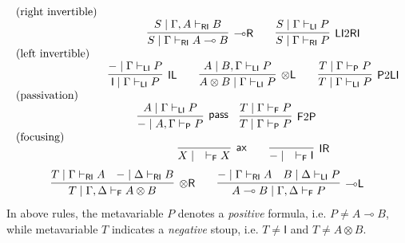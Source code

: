 \documentclass[submission,copyright,creativecommons]{eptcs}
\theoremstyle{definition}
\newcommand{\tl}{\otimes \mathsf{L}}
\newcommand{\tr}{\otimes \mathsf{R}}
\newcommand{\lright}{{\multimap}\mathsf{R}}
\newcommand{\lleft}{{\multimap}\mathsf{L}}
\newcommand{\pass}{\mathsf{pass}}
\newcommand{\unitl}{\mathsf{IL}}
\newcommand{\unitr}{\mathsf{IR}}
\newcommand{\ax}{\mathsf{ax}}
\newcommand{\ot}{\otimes}
\newcommand{\lolli}{\multimap}
\newcommand{\I}{\mathsf{I}}
\newcommand{\RI}{\mathsf{RI}}
\newcommand{\LI}{\mathsf{LI}}
\newcommand{\Pass}{\mathsf{P}}
\newcommand{\F}{\mathsf{F}}
\begin{document}
\begin{displaymath}
  \begin{array}{lc}
    \text{(right invertible)} & \\ &
    \infer[\lright]{S \mid \Gamma \vdash_{\RI} A \lolli B}{S \mid \Gamma , A \vdash_{\RI} B}
    \qquad
    \infer[\LI 2 \RI]{S \mid \Gamma \vdash_{\RI} P}{S \mid \Gamma \vdash_{\LI} P}
    \\
    \text{(left invertible)} & \\ &
    \infer[\unitl]{\I \mid \Gamma \vdash_{\LI} P}{- \mid \Gamma \vdash_{\LI} P}
    \qquad
    \infer[\tl]{A \ot B \mid \Gamma \vdash_{\LI} P}{A \mid B , \Gamma \vdash_{\LI} P}
    \qquad
    \infer[\Pass 2 \LI]{T \mid \Gamma \vdash_{\LI} P}{T \mid \Gamma \vdash_{\Pass} P}
    \\
    \text{(passivation)} & \\ &
    \hspace{-1.7cm}
    \infer[\pass]{- \mid A , \Gamma \vdash_{\Pass} P }{
      A\mid \Gamma \vdash_{\LI} P
    }
    \quad
    \infer[\F 2 \Pass]{T \mid \Gamma \vdash_{\Pass} P}{
      T \mid \Gamma \vdash_{\F} P
    }
    \\
    \text{(focusing)} &    \\ &
    \infer[\ax]{X \mid \quad \vdash_{\F} X}{}
    \qquad
    \infer[\unitr]{- \mid \quad \vdash_{\F} \I}{}
    \\[6pt]
    \multicolumn{2}{c}{
    \infer[\tr]{T \mid \Gamma , \Delta \vdash_{\F} A \ot B}{
      T \mid \Gamma \vdash_{\RI} A
      &
      - \mid \Delta \vdash_{\RI} B
    }
    \qquad
    \infer[\lleft]{A \lolli B \mid \Gamma , \Delta \vdash_{\F} P}{
      - \mid \Gamma \vdash_{\RI} A
      &
      B \mid \Delta \vdash_{\LI} P
    }
    }
  \end{array}
\end{displaymath}
In above rules, the metavariable $P$ denotes a \emph{positive} formula, i.e. $P \not= A \lolli B$, while metavariable $T$ indicates a \emph{negative} stoup, i.e. $T \not= \I$ and $T\not= A \ot B$.
\end{document}

